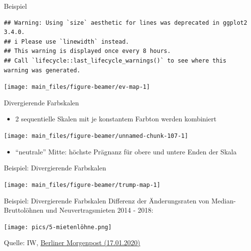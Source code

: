 \documentclass[
  10pt,
  ignorenonframetext,
]{beamer}
\providecommand{\tightlist}{%
  \setlength{\itemsep}{0pt}\setlength{\parskip}{0pt}}
\begin{document}
\begin{frame}[fragile]{Beispiel}
\label{beispiel-1}
\scriptsize

\begin{verbatim}
## Warning: Using `size` aesthetic for lines was deprecated in ggplot2 3.4.0.
## i Please use `linewidth` instead.
## This warning is displayed once every 8 hours.
## Call `lifecycle::last_lifecycle_warnings()` to see where this warning was generated.
\end{verbatim}

\normalsize

\scriptsize

\begin{center}\texttt{[image: main\_files/figure-beamer/ev-map-1]} \end{center}

\normalsize
\end{frame}

\begin{frame}{Divergierende Farbskalen}
\label{divergierende-farbskalen}
\begin{itemize}
\tightlist
\item
  2 sequentielle Skalen mit je konstantem Farbton werden kombiniert
  \scriptsize
\end{itemize}

\begin{center}\texttt{[image: main\_files/figure-beamer/unnamed-chunk-107-1]} \end{center}

\normalsize

\begin{itemize}
\tightlist
\item
  ``neutrale'' Mitte: höchste Prägnanz für obere und untere Enden der
  Skala
\end{itemize}
\end{frame}

\begin{frame}{Beispiel: Divergierende Farbskalen}
\label{beispiel-divergierende-farbskalen}
\scriptsize\normalsize

\scriptsize

\begin{center}\texttt{[image: main\_files/figure-beamer/trump-map-1]} \end{center}

\normalsize
\end{frame}

\begin{frame}{Beispiel: Divergierende Farbskalen}
\label{beispiel-divergierende-farbskalen-1}
Differenz der Änderungsraten von Median-Bruttolöhnen und
Neuvertragsmieten 2014 - 2018:

\texttt{[image: pics/5-mietenlöhne.png]}

Quelle: IW,
\href{https://interaktiv.morgenpost.de/gehalt-miete-studie/}{Berliner
Morgenpost (17.01.2020)}
\end{frame}
\end{document}
